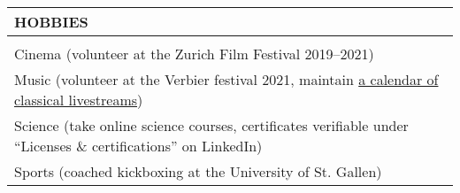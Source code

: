 \documentclass[a4paper,11pt,oneside]{article}
\begin{document}
\vspace{18pt}
\noindent \begin{tabularx}{\textwidth}{L}
    HOBBIES \\
    \midrule \\[-10pt]
    Cinema (volunteer at the Zurich Film Festival 2019--2021) \\
    Music (volunteer at the Verbier festival 2021, maintain \href{https://github.com/ipozdeev/concertscrape}{a calendar of classical livestreams}) \\
    Science (take online science courses, certificates verifiable under ``Licenses \& certifications'' on LinkedIn) \\
    Sports (coached kickboxing at the University of St. Gallen)
\end{tabularx}
\end{document}
